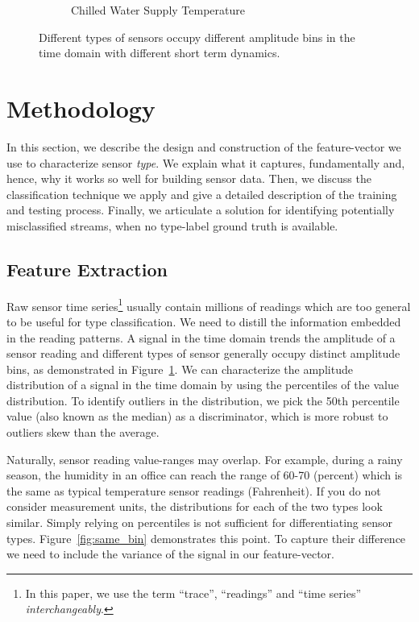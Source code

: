 \begin{figure}[ht!]
\begin{subfigure}{0.32\textwidth}
                \caption{Chilled Water Supply Temperature}
  \end{subfigure}
\caption{Different types of sensors occupy different amplitude bins in the time domain with different short term dynamics.}
\label{fig:example}
\end{figure}

\section{Methodology}
In this section, we describe the design and construction of the feature-vector we use to characterize sensor \emph{type}.  We
explain what it captures, fundamentally and, hence, why it works so well for building sensor data. Then, we discuss
the classification technique we apply and give a detailed description of the training and testing process. Finally, we articulate
a solution for identifying potentially misclassified streams, when no type-label ground truth is available.

\subsection{Feature Extraction}
Raw sensor time series\footnote{In this paper, we use the term ``trace'', ``readings'' and ``time series'' \textit{interchangeably}.} usually contain millions of readings which are too general to be useful for type classification.   We need to distill the information embedded in the reading patterns.
A signal in the time domain trends the amplitude of a sensor reading and different types of sensor generally occupy distinct
amplitude bins, as demonstrated in Figure~\ref{fig:example}. We can characterize the amplitude distribution of a signal in the time
domain by using the percentiles of the value distribution.%
To identify outliers in the distribution, we pick the 50th percentile value (also known as the median) as a discriminator, which
is more robust to outliers skew than the average. 

Naturally, sensor reading value-ranges may overlap. For example, during a rainy season, the humidity in an
office can reach the range of 60-70 (percent) which is the same as typical temperature sensor readings (Fahrenheit).
If you do not consider measurement units, the distributions for each of the two types look similar. 
Simply relying on percentiles is not sufficient for differentiating sensor types. Figure~\ref{fig:same_bin} demonstrates this
point. To capture their difference we need to include the variance of the signal in our feature-vector.

